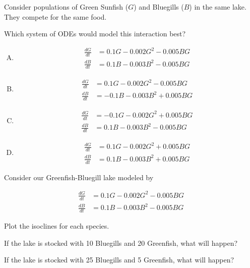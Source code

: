 \begin{applicationActivities}

\begin{activity}{5}
Consider populations of Green Sunfish (\(G\)) and Bluegills (\(B\)) in the same lake.  They compete for the same food.

\vfill
Which system of ODEs would model this interaction best?

\begin{enumerate}[(A)]
\item 
\begin{alignat*}{2}
\frac{dG}{dt} &= 0.1G-0.002G^2-0.005BG \\
\frac{dB}{dt} &= 0.1B-0.003B^2-0.005BG
\end{alignat*}

\item 
\begin{alignat*}{2}
\frac{dG}{dt} &= 0.1G-0.002G^2-0.005BG \\
\frac{dB}{dt} &= -0.1B-0.003B^2+0.005BG
\end{alignat*}

\item 
\begin{alignat*}{2}
\frac{dG}{dt} &= -0.1G-0.002G^2+0.005BG \\
\frac{dB}{dt} &= 0.1B-0.003B^2-0.005BG
\end{alignat*}

\item 
\begin{alignat*}{2}
\frac{dG}{dt} &= 0.1G-0.002G^2+0.005BG \\
\frac{dB}{dt} &= 0.1B-0.003B^2+0.005BG
\end{alignat*}
\end{enumerate}



\end{activity}

\begin{activity}{15}
Consider our Greenfish-Bluegill lake modeled by

\begin{alignat*}{2}
\frac{dG}{dt} &= 0.1G-0.002G^2-0.005BG \\
\frac{dB}{dt} &= 0.1B-0.003B^2-0.005BG
\end{alignat*}

\begin{subactivity}
Plot the isoclines for each species.
\end{subactivity}
\begin{subactivity}
If the lake is stocked with 10 Bluegills and 20 Greenfish, what will happen?
\end{subactivity}
\begin{subactivity}
If the lake is stocked with 25 Bluegills and 5 Greenfish, what will happen?
\end{subactivity}


\end{activity}
\end{applicationActivities}
